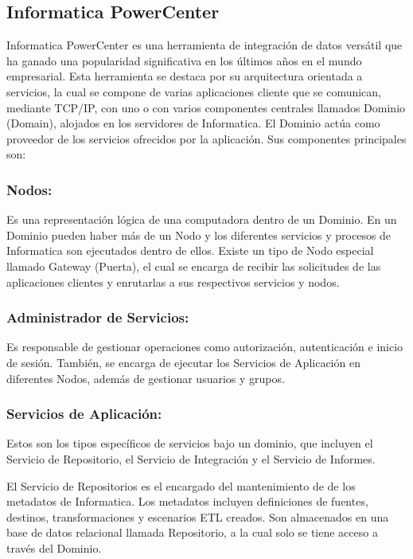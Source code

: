 \subsection{Informatica PowerCenter}

Informatica PowerCenter es una herramienta de integración de datos versátil que ha ganado una popularidad significativa 
en los últimos años en el mundo empresarial. Esta herramienta se destaca por su arquitectura orientada a servicios, 
la cual se compone de varias aplicaciones cliente que se comunican, mediante TCP/IP, con uno o con varios componentes 
centrales llamados Dominio (Domain), alojados en los servidores de Informatica. El Dominio actúa como proveedor de los 
servicios ofrecidos por la aplicación. Sus componentes principales son: 

\subsubsection{Nodos:} 

Es una representaci\'on l\'ogica de una computadora dentro de un Dominio. En un Dominio pueden haber m\'as de un Nodo y 
los diferentes servicios y procesos de Informatica son ejecutados dentro de ellos. Existe un tipo de Nodo especial 
llamado Gateway (Puerta), el cual se encarga de recibir las solicitudes de las aplicaciones clientes y enrutarlas a sus 
respectivos servicios y nodos.

\subsubsection{Administrador de Servicios:} 

Es responsable de gestionar operaciones como autorización, autenticación e inicio de sesión. Tambi\'en, se encarga de 
ejecutar los Servicios de Aplicaci\'on en diferentes Nodos, además de gestionar usuarios y grupos.

\subsubsection{Servicios de Aplicaci\'on:}

Estos son los tipos específicos de servicios bajo un dominio, que incluyen el Servicio de Repositorio, el Servicio de 
Integración y el Servicio de Informes.

El Servicio de Repositorios es el encargado del mantenimiento de de los metadatos de Informatica. Los metadatos incluyen 
definiciones de fuentes, destinos, transformaciones y escenarios ETL creados. Son almacenados en una base de datos 
relacional llamada Repositorio, a la cual solo se tiene acceso a través del Dominio.

